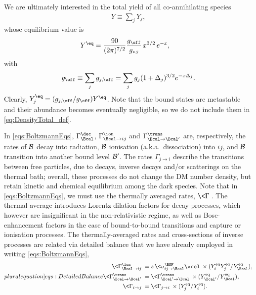\documentclass[preprint,5p,twocolumn]{elsarticle}
\begin{document}
%
We are ultimately interested in the total yield of all co-annihilating species
%
\begin{align}
Y \equiv \sum_j  Y_j ,
\label{eq:DensityTotal_def}
\end{align}
%
whose equilibrium value is 
%
\begin{align}
Y^\eq &= \frac{90}{(2\pi)^{7/2}} 
\frac{g_{\eff}}{g_{*\mathsmaller{S}}} 
\, x^{3/2} \, e^{-x} ,
\label{eq:Yeq}
\end{align}
%
with
%
\begin{align}
g_{\eff} 
\equiv \sum_j g_{j,\eff} 
= \sum_j g_j (1+\Delta_j)^{3/2} e^{-x \Delta_j} .
\label{eq:gDM_def}
\end{align}
%
Clearly, $Y_j^{\eq} = (g_{j,\eff}/g_{\eff}) Y^{\eq}$. Note that the bound states are metastable and their abundance becomes eventually negligible, so we do not include them in \cref{eq:DensityTotal_def}.

In \cref{eqs:BoltzmannEqs}, $\Gamma_{\Bcal}^{\dec}$, $\Gamma_{\Bcal\to ij}^{\ion}$ and $\Gamma_{\Bcal\to\Bcal'}^{\trans}$ are, respectively, the rates of ${\cal B}$ decay into radiation, ${\cal B}$ ionisation (a.k.a.~dissociation) into $ij$, and ${\cal B}$ transition into another bound level ${\cal B}'$. The rates $\Gamma_{j\to i}$ describe the transitions between free particles, due to decays, inverse decays and/or scatterings on the thermal bath; overall, these processes do not change the DM number density, but retain kinetic and chemical equilibrium among the dark species. 
%
Note that in \cref{eqs:BoltzmannEqs}, we must use the thermally averaged rates, $\<\Gamma\>$. The thermal average introduces Lorentz dilation factors for decay processes, which however are insignificant in the non-relativistic regime, as well as Bose-enhancement factors in the case of bound-to-bound transitions and capture or ionisation processes. The thermally-averaged rates and cross-sections of inverse processes are related via detailed balance that we have already employed in writing \cref{eqs:BoltzmannEqs}, 
%
\begin{subequations}
\label{eq:DetailedBalance}
\label[pluralequation]{eqs:DetailedBalance}
\begin{align}
\<\Gamma_{\Bcal \to ij}^{\ion}\> &= s \,
\<\sigma_{ij \to \Bcal}^{\BSF} \vrel \> \times
(Y_i^{\rm eq}Y_j^{\rm eq} / Y_{\Bcal}^{\rm eq}) ,
\label{eq:DetailedBalance_IonBSF}
\\
\<\Gamma_{\Bcal \to \Bcal'}^{\trans}\> &= 
\<\Gamma_{\Bcal'\to \Bcal}^{\trans} \> \times
(Y_{\Bcal'}^{\rm eq} / Y_{\Bcal}^{\rm eq}) ,
\label{eq:DetailedBalance_B2Btransitions}
\\
\<\Gamma_{i\to j}\> &= 
\<\Gamma_{j\to i}\> \times (Y_j^{\rm eq} / Y_i^{\rm eq}) .
\label{eq:DetailedBalance_FreeSpeciesScattering} 
\end{align}
\end{subequations}
\end{document}
